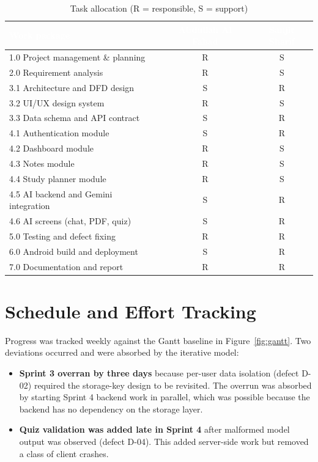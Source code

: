 \documentclass[12pt,a4paper,oneside]{report}
\begin{document}
\begin{table}[H]
\centering
\caption{Task allocation (R = responsible, S = support)}
\label{tab:alloc}
\small
\begin{tabular}{@{}lcc@{}}
\toprule
\rowcolor{tblhead} \textcolor{white}{\textbf{Work package}} &
\textcolor{white}{\textbf{Abdullah Al Fahad}} & \textcolor{white}{\textbf{Sanjit Sharif}} \\
\midrule
1.0 Project management \& planning & R & S \\
2.0 Requirement analysis            & R & S \\
3.1 Architecture and DFD design     & S & R \\
3.2 UI/UX design system             & R & S \\
3.3 Data schema and API contract    & S & R \\
4.1 Authentication module           & S & R \\
4.2 Dashboard module                & R & S \\
4.3 Notes module                    & R & S \\
4.4 Study planner module            & R & S \\
4.5 AI backend and Gemini integration & S & R \\
4.6 AI screens (chat, PDF, quiz)    & S & R \\
5.0 Testing and defect fixing       & R & R \\
6.0 Android build and deployment    & S & R \\
7.0 Documentation and report        & R & R \\
\bottomrule
\end{tabular}
\end{table}

\section{Schedule and Effort Tracking}

Progress was tracked weekly against the Gantt baseline in Figure~\ref{fig:gantt}.
Two deviations occurred and were absorbed by the iterative model:

\begin{itemize}[leftmargin=*, itemsep=2pt]
  \item \textbf{Sprint 3 overran by three days} because per-user data isolation
    (defect D-02) required the storage-key design to be revisited. The overrun was
    absorbed by starting Sprint 4 backend work in parallel, which was possible
    because the backend has no dependency on the storage layer.
  \item \textbf{Quiz validation was added late in Sprint 4} after malformed model
    output was observed (defect D-04). This added server-side work but removed a
    class of client crashes.
\end{itemize}
\end{document}
